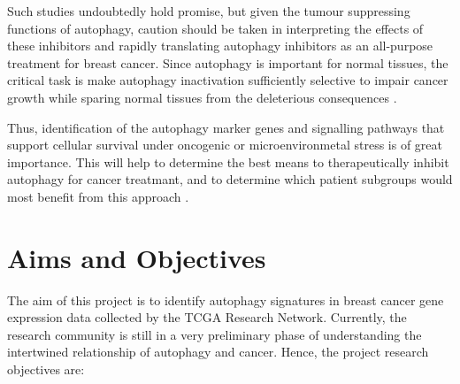 Such studies undoubtedly hold promise, but given the tumour suppressing functions of autophagy, caution should be taken in interpreting the effects of these inhibitors and rapidly translating autophagy inhibitors as an all-purpose treatment for breast cancer. Since autophagy is important for normal tissues, the critical task is make autophagy inactivation sufficiently selective to impair cancer growth while sparing normal tissues from the deleterious consequences \cite{White2015}. 

Thus, identification of the autophagy marker genes and signalling pathways that support cellular survival under oncogenic or microenvironmetal stress is of great importance. This will help to determine the best means to therapeutically inhibit autophagy for cancer treatmant, and to determine which patient subgroups would most benefit from this approach \cite{White2015}. 
















\newpage
\section{Aims and Objectives}


The aim of this project is to identify autophagy signatures in breast cancer gene expression data collected by the TCGA Research Network. Currently, the research community is still in a very preliminary phase of understanding the intertwined relationship of autophagy and cancer. Hence, the project research objectives are:\\


